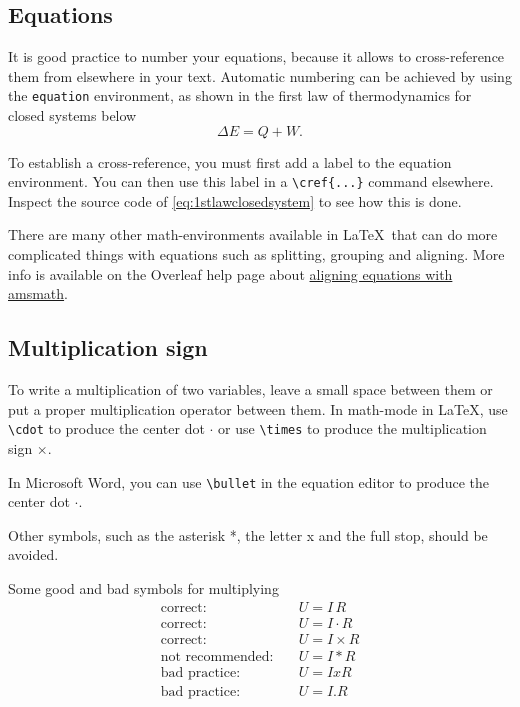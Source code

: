 \subsection{Equations}
It is good practice to number your equations, because it allows to cross-reference them from elsewhere in your text. Automatic numbering can be achieved by using the \texttt{equation} environment, as shown in the first law of thermodynamics for closed systems below
\begin{equation}\label{eq:1stlawclosedsystem}
    \Delta E = Q + W.
\end{equation}

To establish a cross-reference, you must first add a label to the equation environment. You can then use this label in a \verb|\cref{...}| command elsewhere. Inspect the source code of \cref{eq:1stlawclosedsystem} to see how this is done.

There are many other math-environments available in \LaTeX\ that can do more complicated things with equations such as splitting, grouping and aligning. More info is available on the Overleaf help page about \href{https://www.overleaf.com/learn/latex/Aligning_equations_with_amsmath}{aligning equations with amsmath}.

\subsection{Multiplication sign}
To write a multiplication of two variables, leave a small space between them or put a proper multiplication operator between them. In math-mode in \LaTeX, use \verb|\cdot| to produce the center dot $\cdot$ or use \verb|\times| to produce the multiplication sign $\times$.

In Microsoft Word, you can use \verb|\bullet| in the equation editor to produce the center dot $\cdot$.

Other symbols, such as the asterisk *, the letter x and the full stop, should be avoided.
\begin{frame}[fragile]{Some good and bad symbols for multiplying}
    \begin{align*}
    \text{correct:} \quad & U = I\, R \\
    \text{correct:} \quad & U = I\cdot R\\
    \text{correct:} \quad & U = I\times R \\
    \text{not recommended:} \quad & U = I * R \\
    \text{bad practice:} \quad & U = I x R \\
    \text{bad practice:} \quad & U = I.R
    \end{align*}
\end{frame}


